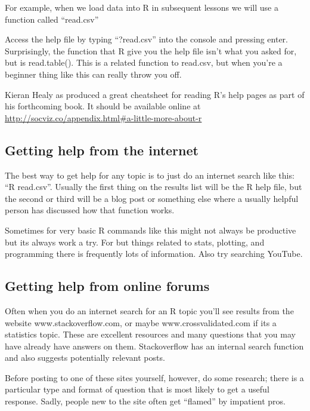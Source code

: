 \documentclass[
]{book}
\begin{document}
For example, when we load data into R in subsequent lessons we will use a function called ``read.csv''

Access the help file by typing ``?read.csv'' into the console and pressing enter. Surprisingly, the function that R give you the help file isn't what you asked for, but is read.table(). This is a related function to read.csv, but when you're a beginner thing like this can really throw you off.

Kieran Healy as produced a great cheatsheet for reading R's help pages as part of his forthcoming book. It should be available online at \url{http://socviz.co/appendix.html\#a-little-more-about-r}

\hypertarget{getting-help-from-the-internet}{%
\subsection{Getting help from the internet}\label{getting-help-from-the-internet}}

The best way to get help for any topic is to just do an internet search like this: ``R read.csv''. Usually the first thing on the results list will be the R help file, but the second or third will be a blog post or something else where a usually helpful person has discussed how that function works.

Sometimes for very basic R commands like this might not always be productive but its always work a try. For but things related to stats, plotting, and programming there is frequently lots of information. Also try searching YouTube.

\hypertarget{getting-help-from-online-forums}{%
\subsection{Getting help from online forums}\label{getting-help-from-online-forums}}

Often when you do an internet search for an R topic you'll see results from the website www.stackoverflow.com, or maybe www.crossvalidated.com if its a statistics topic. These are excellent resources and many questions that you may have already have answers on them. Stackoverflow has an internal search function and also suggests potentially relevant posts.

Before posting to one of these sites yourself, however, do some research; there is a particular type and format of question that is most likely to get a useful response. Sadly, people new to the site often get ``flamed'' by impatient pros.
\end{document}
